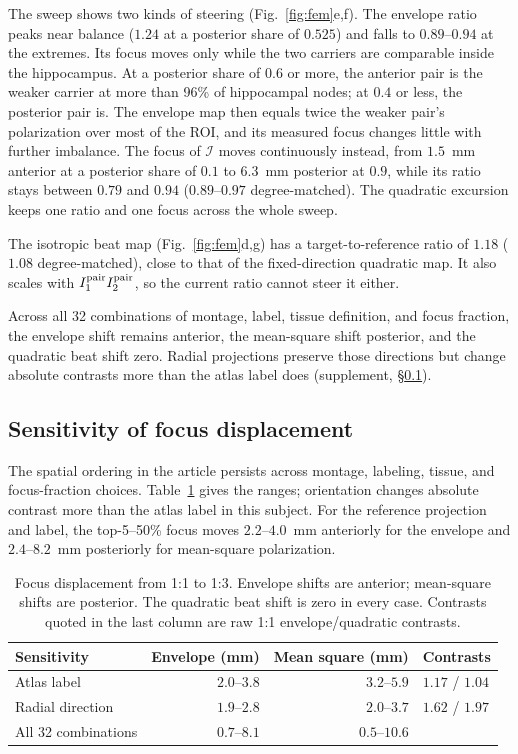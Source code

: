 \documentclass[11pt,a4paper]{article}
\newif\ifjne
\begin{document}
The sweep shows two kinds of steering (Fig.~\ref{fig:fem}e,f). The envelope ratio peaks
near balance ($1.24$ at a posterior share of $0.525$) and falls to $0.89$--$0.94$ at
the extremes. Its focus moves only while the two carriers are comparable inside the
hippocampus. At a posterior share of $0.6$ or more, the anterior pair is the weaker
carrier at more than 96\% of hippocampal nodes; at $0.4$ or less, the posterior pair is. The
envelope map then equals twice the weaker pair's polarization over most of the ROI,
and its measured focus changes little with further imbalance. The focus of $\mathcal I$ moves
continuously instead, from $1.5$~mm anterior at a posterior share of $0.1$ to $6.3$~mm
posterior at $0.9$, while its ratio stays between $0.79$ and $0.94$ ($0.89$--$0.97$
degree-matched). The quadratic excursion keeps one ratio and one focus across the
whole sweep.

The isotropic beat map (Fig.~\ref{fig:fem}d,g) has a target-to-reference ratio of $1.18$
($1.08$ degree-matched), close to that of the fixed-direction quadratic map. It also
scales with $I_1^{\rm pair}I_2^{\rm pair}$, so the current ratio cannot steer it either.

Across all 32 combinations of montage, label, tissue definition, and focus
fraction, the envelope shift remains anterior, the mean-square shift posterior,
and the quadratic beat shift zero. Radial projections preserve those directions
but change absolute contrasts more than the atlas label does (supplement,
\S\ref{supp:fem-sensitivities}).
\ifjne\else
\subsection{Sensitivity of focus displacement}\label{supp:fem-sensitivities}
The spatial ordering in the article persists across montage, labeling, tissue,
and focus-fraction choices. Table~\ref{tab:fem-sensitivities} gives the ranges;
orientation changes absolute contrast more than the atlas label in this subject.
For the reference projection and label, the top-5--50\% focus moves
$2.2$--$4.0$~mm anteriorly for the envelope and $2.4$--$8.2$~mm posteriorly
for mean-square polarization.

\begin{table}[htbp]\centering\small
\caption{Focus displacement from 1:1 to 1:3. Envelope shifts are anterior;
mean-square shifts are posterior. The quadratic beat shift is zero in every case.
Contrasts quoted in the last column are raw 1:1 envelope/quadratic contrasts.}
\label{tab:fem-sensitivities}
\begin{tabular}{@{}lrrl@{}}
\toprule
Sensitivity & Envelope (mm) & Mean square (mm) & Contrasts\\
\midrule
Atlas label & $2.0$--$3.8$ & $3.2$--$5.9$ & $1.17$ / $1.04$\\
Radial direction & $1.9$--$2.8$ & $2.0$--$3.7$ & $1.62$ / $1.97$\\
All 32 combinations & $0.7$--$8.1$ & $0.5$--$10.6$ & \\
\bottomrule
\end{tabular}
\end{table}
\end{document}

